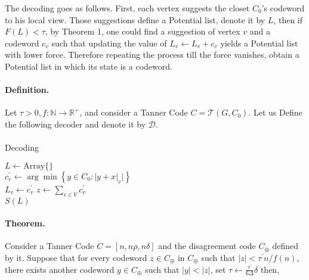 \documentclass{article}
\begin{document}
\begin{multicols*}{2}
  The decoding goes as follows. First, each vertex suggests the closet $C_{0}$'s codeword to his local view. Those suggestions define a Potential list, denote it by $L$, then if $F\left( L \right) <\tau$, by Theorem 1, one could find a suggestion of vertex $v$ and a codeword $c_v$ such that updating the value of $L_{v} \leftarrow L_{v} + c_{v}$ yields a Potential list with lower force. Therefore repeating the process till the force vanishes, obtain a Potential list in which its state is a codeword. 
  \paragraph{Definition.} Let $\tau > 0, f : \mathbb{N} \rightarrow \mathbb{R^{+}}$, and consider a Tanner Code $C = \mathcal{T}\left( G, C_{0} \right)$. Let us Define the following decoder and denote it by $\mathcal{D}$.  
  \paragraph{}
  \begin{algorithm}[H]
    \caption{Decoding}
    \label{alg:three}
    $ L \leftarrow \text{Array} \{ \} $\\
     {
      $c^{\prime}_{v} \leftarrow \arg\min {\left\{  y \in C_{0} : |y + x|_{v} |  \right\} } $\\
      $ L_{v} \leftarrow c^{\prime}_{v}$
    }
    $ z \leftarrow \sum_{v \in V}{c^{\prime}_{v}} $\\
    \Return  $S(L) $

  \end{algorithm}

  \paragraph{Theorem.} Consider a Tanner Code $C = [n, n\rho, n\delta]$ and the disagreement code $C_{\oplus}$ defined by it. Suppose that for every codeword $ z \in C_{\oplus}$ in $C_{\oplus}$ such that $|z| < \tau^{\prime} n / f\left(n\right)$, there exists another codeword $y \in C_{\oplus} $ such that $|y| < |z|$, set $\tau \leftarrow \frac{\tau^{\prime} }{6 \Delta} \delta$ then, 


\end{multicols*}
\end{document}
